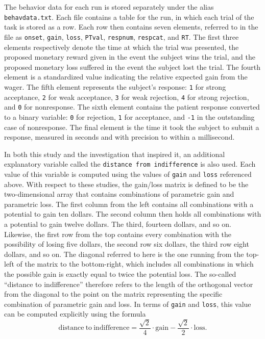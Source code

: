 \par \indent The behavior data for each run is stored separately under the alias
\texttt{behavdata.txt}. Each file contains a table for the run, in which each
trial of the task is stored as a row. Each row then contains seven elements,
referred to in the file as \texttt{onset}, \texttt{gain}, \texttt{loss},
\texttt{PTval}, \texttt{respnum}, \texttt{respcat}, and \texttt{RT}. The first
three elements respectively denote the time at which the trial was presented,
the proposed monetary reward given in the event the subject wins the trial, and
the proposed monetary loss suffered in the event the subject lost the trial. The
fourth element is a standardized value indicating the relative expected gain
from the wager. The fifth element represents the subject's response: \texttt{1}
for strong acceptance, \texttt{2} for weak acceptance, \texttt{3} for weak
rejection, \texttt{4} for strong rejection, and \texttt{0} for nonresponse. The
sixth element contains the patient response converted to a binary variable:
\texttt{0} for rejection, \texttt{1} for acceptance, and \texttt{-1} in the
outstanding case of nonresponse. The final element is the time it took the
subject to submit a response, measured in seconds and with precision to within a
millisecond.

\par \indent In both this study and the investigation that inspired it, an
additional explanatory variable called the \texttt{distance from indifference}
is also used. Each value of this variable is computed using the values of
\texttt{gain} and \texttt{loss} referenced above. With respect to these studies,
the gain/loss matrix is defined to be the two-dimensional array that contains
combinations of parametric gain and parametric loss. The first column from the
left contains all combinations with a potential to gain ten dollars. The second
column then holds all combinations with a potential to gain twelve dollars. The
third, fourteen dollars, and so on. Likewise, the first row from the top
contains every combination with the possibility of losing five dollars, the
second row six dollars, the third row eight dollars, and so on. The diagonal
referred to here is the one running from the top-left of the matrix to the
bottom-right, which includes all combinations in which the possible gain is
exactly equal to twice the potential loss. The so-called ``distance to
indifference'' therefore refers to the length of the orthogonal vector from the
diagonal to the point on the matrix representing the specific combination of
parametric gain and loss. In terms of \texttt{gain} and \texttt{loss}, this
value can be computed explicitly using the formula
\[
\mathrm{distance \ to \ indifference} = \frac{ \sqrt{ 2 } }{ 4 } \cdot
\mathrm{ gain } - \frac{ \sqrt{ 2 } }{ 2 } \cdot \mathrm{ loss }.
\]


